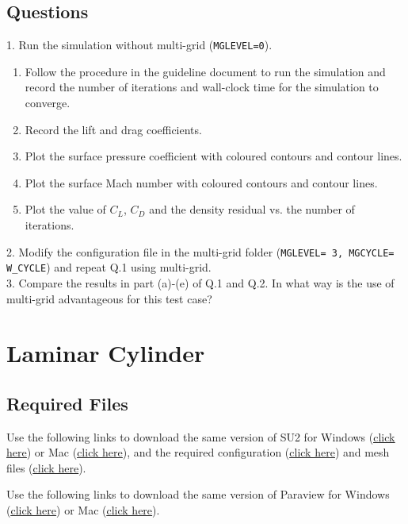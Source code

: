 \section{Questions}
1. Run the simulation without multi-grid (\texttt{MGLEVEL=0}).
\begin{enumerate}[label=(\alph*)]
    \item Follow the procedure in the guideline document to run the simulation and record the number of iterations and wall-clock time for the simulation to converge.
    \item Record the lift and drag coefficients.
    \item Plot the surface pressure coefficient with coloured contours and contour lines.
    \item Plot the surface Mach number with coloured contours and contour lines.
    \item Plot the value of $C_L$, $C_D$ and the density residual vs. the number of iterations.
\end{enumerate}
2. Modify the configuration file in the multi-grid folder (\texttt{MGLEVEL= 3, MGCYCLE= W\_CYCLE}) and repeat Q.1 using multi-grid.\\
3. Compare the results in part (a)-(e) of Q.1 and Q.2. In what way is the use of multi-grid advantageous for this test case?\\
\chapter{Laminar Cylinder}
\label{ch:Laminar Cylinder}
\section{Required Files}
\begin{su2note}
	Use the following links to download the same version of SU2 for Windows (\href{https://users.encs.concordia.ca/~bvermeir/book/executables/windows/SU2-v7.0.0-win64.zip}{\underline{click here}}) or Mac (\href{https://users.encs.concordia.ca/~bvermeir/book/executables/osx/SU2-v7.0.0-macos64.zip}{\underline{click here}}), and the required configuration (\href{https://gitlab.com/bvermeir/book-cfd/blob/master/tutorial/tut4_laminar_cylinder/steady/lam_cylinder.cfg}{\underline{click here}}) and mesh files (\href{https://gitlab.com/bvermeir/book-cfd/blob/master/tutorial/tut4_laminar_cylinder/steady/mesh_cylinder_lam.su2}{\underline{click here}}).
\end{su2note}
\begin{paraviewnote}
	Use the following links to download the same version of Paraview for Windows (\href{https://users.encs.concordia.ca/~bvermeir/book/executables/windows/ParaView-5.4.0-Qt5-OpenGL2-Windows-64bit.exe}{\underline{click here}}) or Mac (\href{https://users.encs.concordia.ca/~bvermeir/book/executables/osx/ParaView-5.4.0-Qt5-OpenGL2-MPI-OSX10.8-64bit.dmg}{\underline{click here}}).
\end{paraviewnote}

